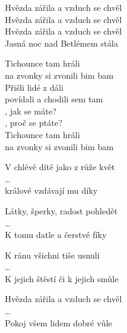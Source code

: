 
\ve{}
Hvězda zářila a vzduch se chvěl\\
Hvězda zářila a vzduch se chvěl\\
Hvězda zářila a vzduch se chvěl\\
Jasná noc nad Betlémem stála

\cho{}
Tichounce tam hráli\\
na zvonky si zvonili bim bam\\
Přišli lidé z dáli\\
povídali a chodili sem tam\\
, jak se máte?\\
, proč se ptáte?\\
Tichounce tam hráli\\
na zvonky si zvonili bim bam

\ve{}
V chlévě dítě jako z růže květ\\
\ldots\\
králové vzdávají mu díky

\ve{}
Látky, šperky, radost pohledět\\
\ldots\\
K tomu datle a čerstvé fíky

\cho{}

\ve{}
K ránu všichni tiše usnuli\\
\ldots\\
K jejich štěstí či k jejich smůle

\ve{}
Hvězda zářila a vzduch se chvěl\\
\ldots\\
Pokoj všem lidem dobré vůle

\cho{}

\esong{}

